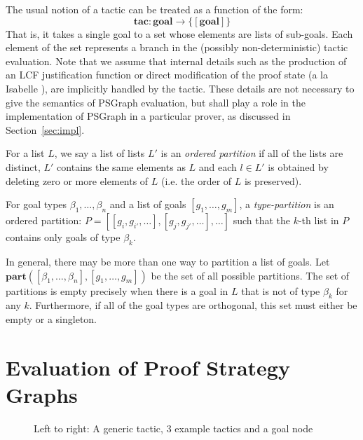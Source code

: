 \documentclass{llncs}
\begin{document}
The usual notion of a tactic can be treated as a function of the form:
\begin{equation}\label{eq:tac}
  \textbf{tac} : \textbf{goal} \to \{ [\textbf{goal}] \}
\end{equation}
That is, it takes a single goal to a set whose elements are lists of sub-goals. Each element of the set represents a branch in the (possibly non-deterministic) tactic evaluation. Note that we assume that 
internal details such as the production of an LCF justification function or direct modification of the proof state (a la Isabelle \cite{paper:Paulson:90}), are implicitly handled by the tactic. These details are not necessary to give the semantics of PSGraph evaluation, but shall play a role in the implementation of PSGraph in a particular prover, as discussed in Section~\ref{sec:impl}.

For a list $L$, we say a list of lists $L'$ is an \textit{ordered partition} if all of the lists are distinct, $L'$ contains the same elements as $L$ and each $l \in L'$ is obtained by deleting zero or more elements of $L$ (i.e. the order of $L$ is preserved).

\begin{definition} \rm
For goal types $\beta_1, \ldots, \beta_n$ and a list of goals $[g_1, \ldots, g_m]$, a \textit{type-partition} is an ordered partition:
\( P = [[g_i, g_{i'}, \ldots], [g_j, g_{j'}, \ldots], \ldots] \)
such that the $k$-th list in $P$ contains only goals of type $\beta_k$.
\end{definition}
In general, there may be more than one way to partition a list of goals. Let $\textbf{part}([\beta_1, \ldots, \beta_n], [g_1, \ldots, g_m])$ be the set of all possible partitions. The set of partitions is empty precisely when there is a goal in $L$ that is not of type $\beta_k$ for any $k$. Furthermore, if all of the goal types are orthogonal, this set must either be empty or a singleton.

\beforesection
\section{Evaluation of Proof Strategy Graphs}\label{sec:lang}
\aftersection


\begin{figure}
  \centering
{}
  \caption{Left to right: A generic tactic, 3 example tactics and a goal node}\label{fig:tac-and-goal-nodes}
\end{figure}
\end{document}
